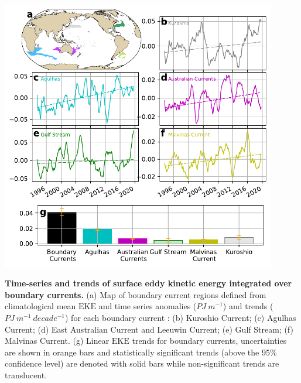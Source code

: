 \documentclass{nature}
\newcommand{\EKE}{\text{EKE}}
\begin{document}
\begin{figureS}
    \centering
	\hspace{0.05\textwidth}\includegraphics[width=0.9\textwidth]{./figures/global_wbc_decomposition_trends.pdf}
	\caption{\textbf{Time-series and trends of surface eddy kinetic energy integrated over boundary currents.} (a) Map of boundary current regions defined from climatological mean $\EKE$ and time series anomalies ($PJ\ m^{-1}$) and trends ($PJ\ m^{-1}\ decade^{-1}$) for each boundary current : (b) Kuroshio Current; (c) Agulhas Current; (d) East Australian Current and Leeuwin Current; (e) Gulf Stream; (f) Malvinas Current. (g) Linear $\EKE$ trends for boundary currents, uncertainties are shown in orange bars and statistically significant trends (above the 95\% confidence level) are denoted with solid bars while non-significant trends are translucent.\label{fig:individual_boundary_currents}}
\end{figureS}
\end{document}
